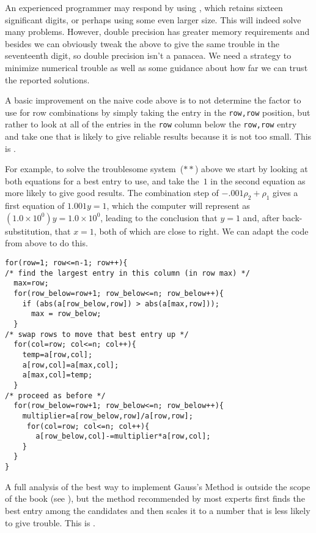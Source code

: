 An experienced programmer may respond by using
, %
which retains sixteen significant digits, 
or perhaps using some even larger size.
This will indeed solve many problems.
However, double precision has greater memory requirements
and besides we can obviously tweak the above to give the
same trouble in the seventeenth digit, so double precision
isn't a panacea.
We need a strategy to minimize numerical
trouble
as well as some guidance about how far we can trust the reported 
solutions.

A basic improvement on the naive code above 
is to not determine the factor to use for row combinations
by simply taking the entry in the \lstinline[style=inline]!row,row! position,
but rather to look at all of the entries in the \lstinline[style=inline]!row!
column below the \lstinline[style=inline]!row,row! entry
and take one that is likely to give reliable results
because it is not too small.
This is .%

For example, to solve the troublesome system~($**$) above
we start by looking at both equations for a best entry to use, 
and take the~$1$ in
the second equation as more likely to give good results.
The combination step of $-.001\rho_2+\rho_1$ gives a first equation of 
$1.001y=1$, which the computer will represent as 
$(1.0\times 10^{0})y=1.0\times 10^{0}$, leading to the conclusion that 
$y=1$ and, after back-substitution, that $x=1$, 
both of which are close to right.  
We can adapt the code from above to do this.
\begin{lstlisting}
for(row=1; row<=n-1; row++){
/* find the largest entry in this column (in row max) */
  max=row;
  for(row_below=row+1; row_below<=n; row_below++){
    if (abs(a[row_below,row]) > abs(a[max,row]));
      max = row_below;
  }
/* swap rows to move that best entry up */
  for(col=row; col<=n; col++){
    temp=a[row,col];
    a[row,col]=a[max,col];
    a[max,col]=temp;
  }
/* proceed as before */
  for(row_below=row+1; row_below<=n; row_below++){
    multiplier=a[row_below,row]/a[row,row];
     for(col=row; col<=n; col++){
       a[row_below,col]-=multiplier*a[row,col];
    }
  }
}
\end{lstlisting}

A full analysis of the best way to implement Gauss's Method 
is outside the scope of the book (see \cite{Wilkinson65}),
but the method recommended by most experts 
first finds the best entry
among the candidates and then scales it to a number that is less
likely to give trouble.
This is 
.

